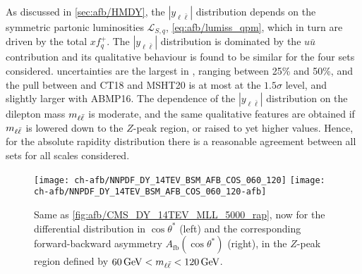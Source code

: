 As discussed in \cref{sec:afb/HMDY}, the  $|y_{\ell\bar{\ell}}|$  distribution
depends  on the symmetric partonic luminosities $\mathcal{L}_{S,q}$, \cref{eq:afb/lumiss_qpm},
which in turn are driven by the total \pdfs $xf^+_q$.
%
The $|y_{\ell\bar{\ell}}|$  distribution
is dominated by the $u\bar{u}$
contribution and its qualitative behaviour is found to be similar for the four \pdf sets considered.
%
\pdf uncertainties are the largest in , ranging between 25\% and 50\%,
and the pull between  and  CT18 and MSHT20 is at most at the
$1.5\sigma$ level, and slightly larger  
with ABMP16.
%
The dependence of the $|y_{\ell\bar{\ell}}|$  distribution on the dilepton mass $m_{\ell\bar{\ell}}$
is moderate, and the same qualitative features are
obtained if $m_{\ell\bar{\ell}}$ is lowered down to the $Z$-peak region, or
raised to yet higher values.
%
Hence, for the absolute rapidity distribution there is a
reasonable agreement between all  \pdf sets for all scales considered.

\begin{figure}[t]
\centering
\texttt{[image: ch-afb/NNPDF\_DY\_14TEV\_BSM\_AFB\_COS\_060\_120]}
\texttt{[image: ch-afb/NNPDF\_DY\_14TEV\_BSM\_AFB\_COS\_060\_120-afb]}
\caption{
  Same as \cref{fig:afb/CMS_DY_14TEV_MLL_5000_rap}, now for the differential
  distribution in $\cos\theta^*$ (left) and the corresponding forward-backward
  asymmetry
  $A_{\text{fb}}(\cos\theta^*)$ (right), in the $Z$-peak region defined by
  $\SI{60}{\giga\electronvolt} < m_{\ell\bar{\ell}} < \SI{120}{\giga\electronvolt}$.
}
\label{fig:afb/CMS_DY_14TEV_MLL_zpeak}
\end{figure}


